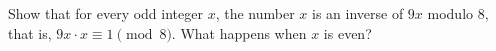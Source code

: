 Show that for every odd integer $x$, the number $x$ is an inverse of $9x$ modulo $8$, that is, $9x\cdot x\equiv1\pmod 8$. What happens when $x$ is even?
